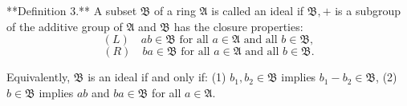 **Definition 3.** A subset $\mathfrak{B}$ of a ring $\mathfrak{A}$ is called an ideal if $\mathfrak{B}, +$ is a subgroup of the additive group of $\mathfrak{A}$ and $\mathfrak{B}$ has the closure properties:
$$(L)\quad ab \in \mathfrak{B} \text{ for all } a \in \mathfrak{A} \text{ and all } b \in \mathfrak{B},$$
$$(R)\quad ba \in \mathfrak{B} \text{ for all } a \in \mathfrak{A} \text{ and all } b \in \mathfrak{B}.$$

Equivalently, $\mathfrak{B}$ is an ideal if and only if:
(1) $b_1, b_2 \in \mathfrak{B}$ implies $b_1 - b_2 \in \mathfrak{B}$,
(2) $b \in \mathfrak{B}$ implies $ab$ and $ba \in \mathfrak{B}$ for all $a \in \mathfrak{A}$.
